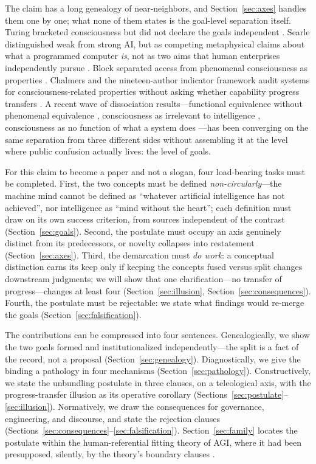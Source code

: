 \documentclass[10pt]{article}
\begin{document}
The claim has a long genealogy of near-neighbors, and Section~\ref{sec:axes} handles them one by one; what none of them states is the goal-level separation itself. Turing bracketed consciousness but did not declare the goals independent \cite{turing1950}. Searle distinguished weak from strong AI, but as competing metaphysical claims about what a programmed computer \emph{is}, not as two aims that human enterprises independently pursue \cite{searle1980}. Block separated access from phenomenal consciousness as properties \cite{block1995}. Chalmers and the nineteen-author indicator framework audit systems for consciousness-related properties without asking whether capability progress transfers \cite{chalmers2023llm,butlin2023consciousness}. A recent wave of dissociation results---functional equivalence without phenomenal equivalence \cite{findlay2024dissociating}, consciousness as irrelevant to intelligence \cite{pesonen2026notobstacles}, consciousness as no function of what a system does \cite{seth2025conscious}---has been converging on the same separation from three different sides without assembling it at the level where public confusion actually lives: the level of goals.

For this claim to become a paper and not a slogan, four load-bearing tasks must be completed. First, the two concepts must be defined \emph{non-circularly}---the machine mind cannot be defined as ``whatever artificial intelligence has not achieved'', nor intelligence as ``mind without the heart''; each definition must draw on its own success criterion, from sources independent of the contrast (Section~\ref{sec:goals}). Second, the postulate must occupy an axis genuinely distinct from its predecessors, or novelty collapses into restatement (Section~\ref{sec:axes}). Third, the demarcation must \emph{do work}: a conceptual distinction earns its keep only if keeping the concepts fused versus split changes downstream judgments; we will show that one clarification---no transfer of progress---changes at least four (Section~\ref{sec:illusion}, Section~\ref{sec:consequences}). Fourth, the postulate must be rejectable: we state what findings would re-merge the goals (Section~\ref{sec:falsification}).

The contributions can be compressed into four sentences. Genealogically, we show the two goals formed and institutionalized independently---the split is a fact of the record, not a proposal (Section~\ref{sec:genealogy}). Diagnostically, we give the binding a pathology in four mechanisms (Section~\ref{sec:pathology}). Constructively, we state the unbundling postulate in three clauses, on a teleological axis, with the progress-transfer illusion as its operative corollary (Sections~\ref{sec:postulate}--\ref{sec:illusion}). Normatively, we draw the consequences for governance, engineering, and discourse, and state the rejection clauses (Sections~\ref{sec:consequences}--\ref{sec:falsification}). Section~\ref{sec:family} locates the postulate within the human-referential fitting theory of AGI, where it had been presupposed, silently, by the theory's boundary clauses \cite{yu2026fitting}.
\end{document}

